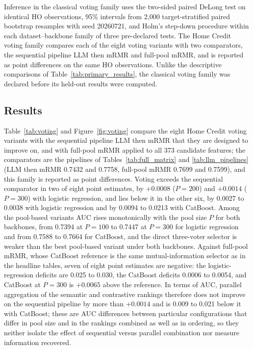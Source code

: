\documentclass[final,5p,twocolumn]{elsarticle}
\begin{document}
Inference in the classical voting family uses the two-sided paired DeLong test \cite{delong1988} on identical HO observations, 95\% intervals from 2,000 target-stratified paired bootstrap resamples with seed 20260721, and Holm's step-down procedure \cite{holm1979} within each dataset--backbone family of three pre-declared tests. The Home Credit voting family compares each of the eight voting variants with two comparators, the sequential pipeline LLM then mRMR and full-pool mRMR, and is reported as point differences on the same HO observations. Unlike the descriptive comparisons of Table~\ref{tab:primary_results}, the classical voting family was declared before its held-out results were computed.

\subsection{Results}
\label{subsec:voting_results}

Table~\ref{tab:voting} and Figure~\ref{fig:voting} compare the eight Home Credit voting variants with the sequential pipeline LLM then mRMR that they are designed to improve on, and with full-pool mRMR applied to all 373 candidate features; the comparators are the pipelines of Tables~\ref{tab:full_matrix} and \ref{tab:llm_pipelines} (LLM then mRMR 0.7432 and 0.7758, full-pool mRMR 0.7699 and 0.7599), and this family is reported as point differences. Voting exceeds the sequential comparator in two of eight point estimates, by $+0.0008$ ($P=200$) and $+0.0014$ ($P=300$) with logistic regression, and lies below it in the other six, by 0.0027 to 0.0038 with logistic regression and by 0.0094 to 0.0213 with CatBoost. Among the pool-based variants AUC rises monotonically with the pool size $P$ for both backbones, from 0.7394 at $P=100$ to 0.7447 at $P=300$ for logistic regression and from 0.7588 to 0.7664 for CatBoost, and the direct three-voter selector is weaker than the best pool-based variant under both backbones. Against full-pool mRMR, whose CatBoost reference is the same mutual-information selector as in the headline tables, seven of eight point estimates are negative: the logistic-regression deficits are 0.025 to 0.030, the CatBoost deficits 0.0006 to 0.0054, and CatBoost at $P=300$ is $+0.0065$ above the reference. In terms of AUC, parallel aggregation of the semantic and contrastive rankings therefore does not improve on the sequential pipeline by more than $+0.0014$ and is 0.009 to 0.021 below it with CatBoost; these are AUC differences between particular configurations that differ in pool size and in the rankings combined as well as in ordering, so they neither isolate the effect of sequential versus parallel combination nor measure information recovered.
\end{document}
